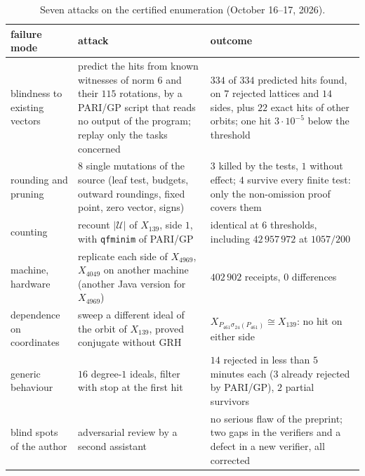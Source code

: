 \documentclass[11pt,a4paper]{amsart}
\theoremstyle{plain}
\theoremstyle{definition}
\newcommand{\Uc}{\mathcal{U}}
\begin{document}
\begin{table}[ht]
\caption{Seven attacks on the certified enumeration (October 16--17, 2026).}\label{tab:audit}
\centering\small\renewcommand{\arraystretch}{1.15}
\begin{tabular}{>{\raggedright\arraybackslash}p{2.9cm}>{\raggedright\arraybackslash}p{6.1cm}>{\raggedright\arraybackslash}p{5.1cm}}
\toprule
failure mode & attack & outcome \\
\midrule
blindness to existing vectors & predict the hits from known witnesses of norm $6$ and their $115$ rotations, by a PARI/GP script that reads no output of the program; replay only the tasks concerned & $334$ of $334$ predicted hits found, on $7$ rejected lattices and $14$ sides, plus $22$ exact hits of other orbits; one hit $3\cdot10^{-5}$ below the threshold \\
rounding and pruning & $8$ single mutations of the source (leaf test, budgets, outward roundings, fixed point, zero vector, signs) & $3$ killed by the tests, $1$ without effect; $4$ survive every finite test: only the non-omission proof covers them \\
counting & recount $|\Uc|$ of $X_{139}$, side $1$, with \texttt{qfminim} of PARI/GP & identical at $6$ thresholds, including $42\,957\,972$ at $1057/200$ \\
machine, hardware & replicate each side of $X_{4969}$, $X_{4049}$ on another machine (another Java version for $X_{4969}$) & $402\,902$ receipts, $0$ differences \\
dependence on coordinates & sweep a different ideal of the orbit of $X_{139}$, proved conjugate without GRH & $X_{P_{461}\sigma_{24}(P_{461})}\cong X_{139}$: no hit on either side \\
generic behaviour & $16$ degree-$1$ ideals, filter with stop at the first hit & $14$ rejected in less than $5$ minutes each ($3$ already rejected by PARI/GP), $2$ partial survivors \\
blind spots of the author & adversarial review by a second assistant & no serious flaw of the preprint; two gaps in the verifiers and a defect in a new verifier, all corrected \\
\bottomrule
\end{tabular}
\end{table}
\end{document}
